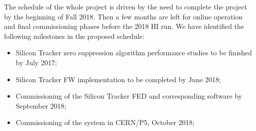 
The schedule of the whole project is driven by the need to complete the project by the beginning of Fall 2018. Then a few months are left for online operation and final commissioning phases before the 2018 HI run. We have identified the following milestones in the proposed schedule:

\begin{itemize}
\item Silicon Tracker zero suppression algorithm performance studies to be finished by July 2017;
\item Silicon Tracker FW implementation to be completed by June 2018;
\item Commissioning of the Silicon Tracker FED and corresponding software by September 2018;
\item Commissioning of the system in CERN/P5, October 2018;
\end{itemize}
